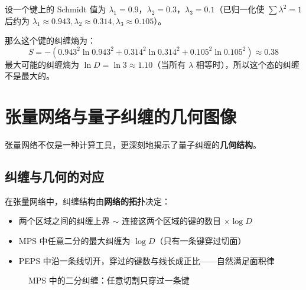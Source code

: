 \documentclass[12pt,a4paper]{ctexart}
\begin{document}
\begin{examplebox}[例24：从MPS读出纠缠熵]
设一个键上的 Schmidt 值为 $\lambda_1 = 0.9$，$\lambda_2 = 0.3$，$\lambda_3 = 0.1$（已归一化使 $\sum \lambda^2 = 1$ 后约为 $\lambda_1 \approx 0.943, \lambda_2 \approx 0.314, \lambda_3 \approx 0.105$）。

那么这个键的纠缠熵为：
\[
S = -(0.943^2 \ln 0.943^2 + 0.314^2 \ln 0.314^2 + 0.105^2 \ln 0.105^2) \approx 0.38
\]
最大可能的纠缠熵为 $\ln D = \ln 3 \approx 1.10$（当所有 $\lambda$ 相等时），所以这个态的纠缠不是最大的。
\end{examplebox}

\section{张量网络与量子纠缠的几何图像}

张量网络不仅是一种计算工具，更深刻地揭示了量子纠缠的\textbf{几何结构}。

\subsection{纠缠与几何的对应}

在张量网络中，纠缠结构由\textbf{网络的拓扑}决定：
\begin{itemize}
    \item 两个区域之间的纠缠上界 $\sim$ 连接这两个区域的键的数目 $\times \log D$
    \item MPS 中任意二分的最大纠缠为 $\log D$（只有一条键穿过切面）
    \item PEPS 中沿一条线切开，穿过的键数与线长成正比——自然满足面积律
\end{itemize}

\begin{figure}[H]
\centering
{}
\caption{MPS 中的二分纠缠：任意切割只穿过一条键}
\end{figure}
\end{document}
